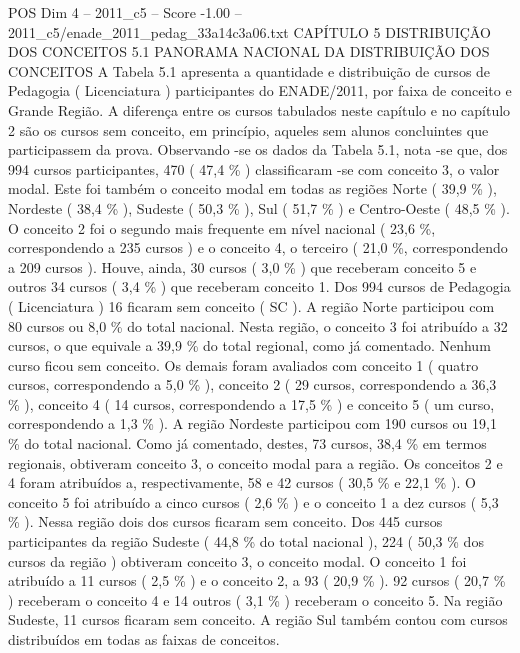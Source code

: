 \begin{textsample}{POS Dim 4 – 2011\_c5 – Score -1.00 – 2011\_c5/enade\_2011\_pedag\_33a14c3a06.txt}  \label{ex:f4_pos_245}
CAPÍTULO 5 DISTRIBUIÇÃO DOS CONCEITOS 5.1 PANORAMA NACIONAL DA DISTRIBUIÇÃO DOS CONCEITOS A Tabela 5.1 apresenta a quantidade e distribuição de cursos de Pedagogia ( Licenciatura ) participantes do ENADE/2011, por faixa de conceito e Grande Região.
A diferença entre os cursos tabulados neste capítulo e no capítulo 2 são os cursos sem conceito, em princípio, aqueles sem alunos concluintes que participassem da prova.
Observando -se os dados da Tabela 5.1, nota -se que, dos 994 cursos participantes, 470 ( 47,4 \% ) classificaram -se com conceito 3, o valor modal.
Este foi também o conceito modal em todas as regiões Norte ( 39,9 \% ), Nordeste ( 38,4 \% ), Sudeste ( 50,3 \% ), Sul ( 51,7 \% ) e Centro-Oeste ( 48,5 \% ).
O conceito 2 foi o segundo mais frequente em nível nacional ( 23,6 \%, correspondendo a 235 cursos ) e o conceito 4, o terceiro ( 21,0 \%, correspondendo a 209 cursos ).
Houve, ainda, 30 cursos ( 3,0 \% ) que receberam conceito 5 e outros 34 cursos ( 3,4 \% ) que receberam conceito 1.
Dos 994 cursos de Pedagogia ( Licenciatura ) 16 ficaram sem conceito ( SC ).
A região Norte participou com 80 cursos ou 8,0 \% do total nacional.
Nesta região, o conceito 3 foi atribuído a 32 cursos, o que equivale a 39,9 \% do total regional, como já comentado.
Nenhum curso ficou sem conceito.
Os demais foram avaliados com conceito 1 ( quatro cursos, correspondendo a 5,0 \% ), conceito 2 ( 29 cursos, correspondendo a 36,3 \% ), conceito 4 ( 14 cursos, correspondendo a 17,5 \% ) e conceito 5 ( um curso, correspondendo a 1,3 \% ).
A região Nordeste participou com 190 cursos ou 19,1 \% do total nacional.
Como já comentado, destes, 73 cursos, 38,4 \% em termos regionais, obtiveram conceito 3, o conceito modal para a região.
Os conceitos 2 e 4 foram atribuídos a, respectivamente, 58 e 42 cursos ( 30,5 \% e 22,1 \% ).
O conceito 5 foi atribuído a cinco cursos ( 2,6 \% ) e o conceito 1 a dez cursos ( 5,3 \% ).
Nessa região dois dos cursos ficaram sem conceito.
Dos 445 cursos participantes da região Sudeste ( 44,8 \% do total nacional ), 224 ( 50,3 \% dos cursos da região ) obtiveram conceito 3, o conceito modal.
O conceito 1 foi atribuído a 11 cursos ( 2,5 \% ) e o conceito 2, a 93 ( 20,9 \% ). 92 cursos ( 20,7 \% ) receberam o conceito 4 e 14 outros ( 3,1 \% ) receberam o conceito 5.
Na região Sudeste, 11 cursos ficaram sem conceito.
A região Sul também contou com cursos distribuídos em todas as faixas de conceitos.

\end{textsample}
